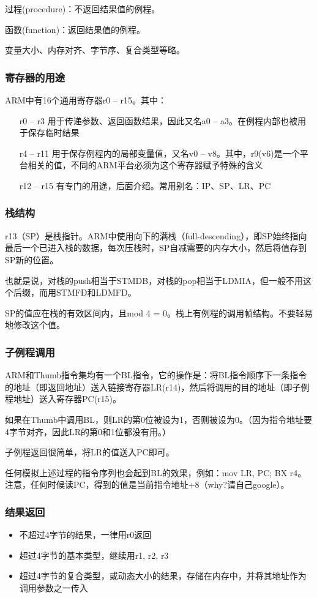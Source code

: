 过程(procedure)：不返回结果值的例程。

函数(function)：返回结果值的例程。

变量大小、内存对齐、字节序、复合类型等略。
\subsubsection{寄存器的用途}

ARM中有16个通用寄存器r0 – r15。其中：
\begin{itemize}
\item[r0 – r3] 用于传递参数、返回函数结果，因此又名a0 – a3。在例程内部也被用于保存临时结果
\item[r4 – r11] 用于保存例程内的局部变量值，又名v0 – v8。其中，r9(v6)是一个平台相关的值，不同的ARM平台必须为这个寄存器赋予特殊的含义
\item[r12 – r15] 有专门的用途，后面介绍。常用别名：IP、SP、LR、PC
\end{itemize}
\subsubsection{栈结构}

r13（SP）是栈指针。ARM中使用向下的满栈（full-descending），即SP始终指向最后一个已进入栈的数据，每次压栈时，SP自减需要的内存大小，然后将值存到SP新的位置。

也就是说，对栈的push相当于STMDB，对栈的pop相当于LDMIA，但一般不用这个后缀，而用STMFD和LDMFD。

SP的值应在栈的有效区间内，且mod 4 = 0。栈上有例程的调用帧结构。不要轻易地修改这个值。

\subsubsection{子例程调用}

ARM和Thumb指令集均有一个BL指令，它的操作是：将BL指令顺序下一条指令的地址（即返回地址）送入链接寄存器LR(r14)，然后将调用的目的地址（即子例程地址）送入寄存器PC(r15)。

如果在Thumb中调用BL，则LR的第0位被设为1，否则被设为0。（因为指令地址要4字节对齐，因此LR的第0和1位都没有用。）

子例程返回很简单，将LR的值送入PC即可。

任何模拟上述过程的指令序列也会起到BL的效果，例如：mov LR, PC; BX r4。注意，任何时候读PC，得到的值是当前指令地址+8（why?请自己google）。

\subsubsection{结果返回}
\begin{itemize}
\item 不超过4字节的结果，一律用r0返回
\item 超过4字节的基本类型，继续用r1, r2, r3
\item 超过4字节的复合类型，或动态大小的结果，存储在内存中，并将其地址作为调用参数之一传入
\end{itemize}
